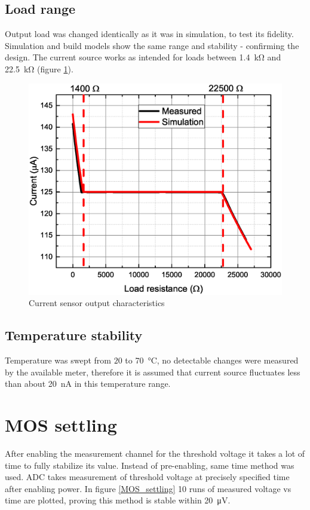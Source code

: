     \subsection{Load range}
        Output load was changed identically as it was in simulation, to test its fidelity. Simulation and build models show the same range and stability - confirming the design. The current source works as intended for loads between \SI{1.4}{\kilo\ohm} and \SI{22.5}{\kilo\ohm} (figure \ref{Current_sensor_output_characteristics}).
        \begin{figure}[H]
            \centering
            \includegraphics[width=0.9\paperwidth]{img/07/output_resistance.eps}
            \caption{Current sensor output characteristics}
            \label{Current_sensor_output_characteristics}
        \end{figure}

    \subsection{Temperature stability}
        Temperature was swept from $20$ to \SI{70}{\degreeCelsius}, no detectable changes were measured by the available meter, therefore it is assumed that current source fluctuates less than about \SI{20}{\nano\ampere} in this temperature range.

\section{MOS settling}
    After enabling the measurement channel for the threshold voltage it takes a lot of time to fully stabilize its value. Instead of pre-enabling, same time method was used. ADC takes measurement of threshold voltage at precisely specified time after enabling power. In figure \ref{MOS_settling} 10 runs of measured voltage vs time are plotted, proving this method is stable within \SI{20}{\uV}.


